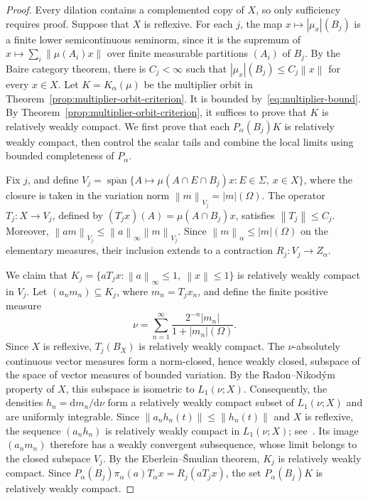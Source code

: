 \documentclass[11pt,leqno]{amsart}
\theoremstyle{compact}
\numberwithin{equation}{section}
\theoremstyle{compactremark}
\theoremstyle{compact}
\def\cspan{\overline{\operatorname{span}}}
\newcommand{\1}{\mathbbm{1}}
\newcommand{\rmd}{\mathrm{d}}
\newcommand{\norm}[1]{\left\|#1\right\|}
\newcommand{\abs}[1]{\left|#1\right|}
\begin{document}
\begin{proof}
Every dilation contains a complemented copy of $X$, so only sufficiency requires proof. Suppose that $X$ is reflexive. For each $j$, the map $x\mapsto\abs{\mu_x}(B_j)$ is a finite lower semicontinuous seminorm, since it is the supremum of $x\mapsto\sum_i\norm{\mu(A_i)x}$ over finite measurable partitions $(A_i)$ of $B_j$. By the Baire category theorem, there is $C_j<\infty$ such that $\abs{\mu_x}(B_j)\leq C_j\norm{x}$ for every $x\in X$.
\begingroup
Let $K=K_\alpha(\mu)$ be the multiplier orbit in Theorem~\ref{prop:multiplier-orbit-criterion}. It is bounded by~\eqref{eq:multiplier-bound}. By Theorem~\ref{prop:multiplier-orbit-criterion}, it suffices to prove that $K$ is relatively weakly compact. We first prove that each $P_\alpha(B_j)K$ is relatively weakly compact, then control the scalar tails and combine the local limits using bounded completeness of $P_\alpha$.
\par\endgroup

Fix $j$, and define $V_j=\cspan\{A\mapsto\mu(A\cap E\cap B_j)x:E\in\Sigma,\ x\in X\}$, where the closure is taken in the variation norm $\norm{m}_{V_j}=\abs{m}(\Omega)$. The operator $T_j\colon X\to V_j$, defined by $(T_jx)(A)=\mu(A\cap B_j)x$, satisfies $\norm{T_j}\leq C_j$. Moreover, $\norm{am}_{V_j}\leq\norm{a}_\infty\norm{m}_{V_j}$. Since $\norm{m}_\alpha\leq\abs{m}(\Omega)$ on the elementary measures, their inclusion extends to a contraction $R_j\colon V_j\to Z_\alpha$.

We claim that $K_j=\{aT_jx:\norm{a}_\infty\leq1,\ \norm{x}\leq1\}$ is relatively weakly compact in $V_j$. Let $(a_nm_n)\subseteq K_j$, where $m_n=T_jx_n$, and define the finite positive measure
\[
\nu=\sum_{n=1}^{\infty}\frac{2^{-n}\abs{m_n}}{1+\abs{m_n}(\Omega)}.
\]
Since $X$ is reflexive, $T_j(B_X)$ is relatively weakly compact. The $\nu$-absolutely continuous vector measures form a norm-closed, hence weakly closed, subspace of the space of vector measures of bounded variation. By the Radon--Nikod\'ym property of $X$, this subspace is isometric to $L_1(\nu;X)$. Consequently, the densities $h_n=\rmd m_n/\rmd\nu$ form a relatively weakly compact subset of $L_1(\nu;X)$ and are uniformly integrable. Since $\norm{a_nh_n(t)}\leq\norm{h_n(t)}$ and $X$ is reflexive, the sequence $(a_nh_n)$ is relatively weakly compact in $L_1(\nu;X)$; see~\cite{Diestel1977}. Its image $(a_nm_n)$ therefore has a weakly convergent subsequence, whose limit belongs to the closed subspace $V_j$. By the Eberlein--\v Smulian theorem, $K_j$ is relatively weakly compact. Since $P_\alpha(B_j)\pi_\alpha(a)T_\alpha x=R_j(aT_jx)$, the set $P_\alpha(B_j)K$ is relatively weakly compact.


\end{proof}
\end{document}
